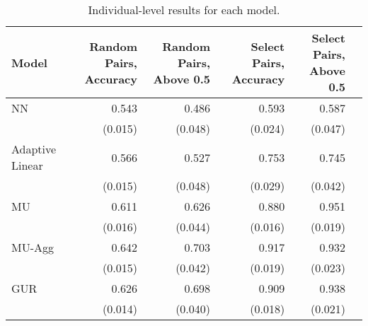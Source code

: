 \begin{table}[ht]
\centering
\begin{tabular}{lrrrrr}
  \toprule
Model & Random Pairs, Accuracy & Random Pairs, Above 0.5 & Select Pairs, Accuracy & Select Pairs, Above 0.5 \\ 
  \midrule
NN & 0.543 & 0.486 & 0.593 & 0.587 \\ 
 & (0.015) & (0.048) & (0.024) & (0.047) \\ 
Adaptive Linear & 0.566 & 0.527 & 0.753 & 0.745 \\ 
 & (0.015) & (0.048) & (0.029) & (0.042) \\ 
MU & 0.611 & 0.626 & 0.880 & 0.951 \\ 
 & (0.016) & (0.044) & (0.016) & (0.019) \\ 
MU-Agg & 0.642 & 0.703 & 0.917 & 0.932 \\ 
 & (0.015) & (0.042) & (0.019) & (0.023) \\ 
GUR & 0.626 & 0.698 & 0.909 & 0.938 \\ 
 & (0.014) & (0.040) & (0.018) & (0.021) \\ 
   \bottomrule
\end{tabular}
\caption{Individual-level results for each model.} 
\end{table}